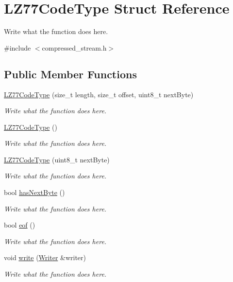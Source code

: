\hypertarget{structLZ77CodeType}{\section{L\+Z77\+Code\+Type Struct Reference}
\label{structLZ77CodeType}
}


Write what the function does here.  




{\ttfamily \#include $<$compressed\+\_\+stream.\+h$>$}

\subsection*{Public Member Functions}
\begin{DoxyCompactItemize}
\item 
\hyperlink{structLZ77CodeType_a3f8c29e5f88aff1053705e5a651a443f}{L\+Z77\+Code\+Type} (size\+\_\+t length, size\+\_\+t offset, uint8\+\_\+t next\+Byte)
\begin{DoxyCompactList}\small\item\em Write what the function does here. \end{DoxyCompactList}\item 
\hyperlink{structLZ77CodeType_aa351bb407acf14bc5cd5eee2715c5a0e}{L\+Z77\+Code\+Type} ()
\begin{DoxyCompactList}\small\item\em Write what the function does here. \end{DoxyCompactList}\item 
\hyperlink{structLZ77CodeType_a008eb3e8953c86bf3ae044c6824321cc}{L\+Z77\+Code\+Type} (uint8\+\_\+t next\+Byte)
\begin{DoxyCompactList}\small\item\em Write what the function does here. \end{DoxyCompactList}\item 
bool \hyperlink{structLZ77CodeType_a36290b0883b9280e74fab0f2a051bdd6}{has\+Next\+Byte} ()
\begin{DoxyCompactList}\small\item\em Write what the function does here. \end{DoxyCompactList}\item 
bool \hyperlink{structLZ77CodeType_a7277c9ee60156ee1b577d9b30cac3402}{eof} ()
\begin{DoxyCompactList}\small\item\em Write what the function does here. \end{DoxyCompactList}\item 
void \hyperlink{structLZ77CodeType_adf2ddd7196f0b8a4e60cddfccb60795c}{write} (\hyperlink{classWriter}{Writer} \&writer)
\begin{DoxyCompactList}\small\item\em Write what the function does here. \end{DoxyCompactList}\end{DoxyCompactItemize}
